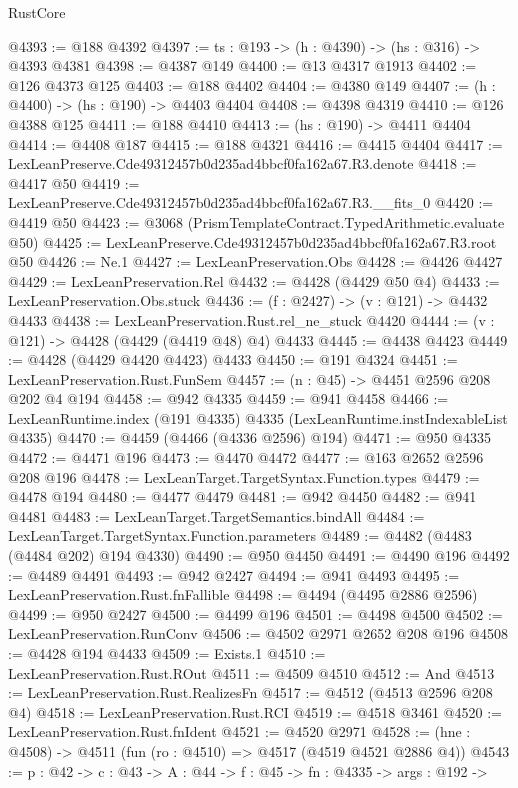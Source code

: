\begin{lexlean}{RustCore}
\begin{coremodule}
@4393 := @188 @4392
@4397 := {ts : @193} -> (h : @4390) -> (hs : @316) -> @4393 @4381
@4398 := @4387 @149
@4400 := @13 @4317 @1913
@4402 := @126 @4373 @125
@4403 := @188 @4402
@4404 := @4380 @149
@4407 := (h : @4400) -> (hs : @190) -> @4403 @4404
@4408 := @4398 @4319
@4410 := @126 @4388 @125
@4411 := @188 @4410
@4413 := (hs : @190) -> @4411 @4404
@4414 := @4408 @187
@4415 := @188 @4321
@4416 := @4415 @4404
@4417 := LexLeanPreserve.Cde49312457b0d235ad4bbcf0fa162a67.R3.denote
@4418 := @4417 @50
@4419 := LexLeanPreserve.Cde49312457b0d235ad4bbcf0fa162a67.R3.__fits_0
@4420 := @4419 @50
@4423 := @3068 (PrismTemplateContract.TypedArithmetic.evaluate @50)
@4425 := LexLeanPreserve.Cde49312457b0d235ad4bbcf0fa162a67.R3.root @50
@4426 := Ne.{1}
@4427 := LexLeanPreservation.Obs
@4428 := @4426 @4427
@4429 := LexLeanPreservation.Rel
@4432 := @4428 (@4429 @50 @4)
@4433 := LexLeanPreservation.Obs.stuck
@4436 := (f : @2427) -> (v : @121) -> @4432 @4433
@4438 := LexLeanPreservation.Rust.rel_ne_stuck @4420
@4444 := (v : @121) -> @4428 (@4429 (@4419 @48) @4) @4433
@4445 := @4438 @4423
@4449 := @4428 (@4429 @4420 @4423) @4433
@4450 := @191 @4324
@4451 := LexLeanPreservation.Rust.FunSem
@4457 := (n : @45) -> @4451 @2596 @208 @202 @4 @194
@4458 := @942 @4335
@4459 := @941 @4458
@4466 := LexLeanRuntime.index (@191 @4335) @4335 (LexLeanRuntime.instIndexableList @4335)
@4470 := @4459 (@4466 (@4336 @2596) @194)
@4471 := @950 @4335
@4472 := @4471 @196
@4473 := @4470 @4472
@4477 := @163 @2652 @2596 @208 @196
@4478 := LexLeanTarget.TargetSyntax.Function.types
@4479 := @4478 @194
@4480 := @4477 @4479
@4481 := @942 @4450
@4482 := @941 @4481
@4483 := LexLeanTarget.TargetSemantics.bindAll
@4484 := LexLeanTarget.TargetSyntax.Function.parameters
@4489 := @4482 (@4483 (@4484 @202) @194 @4330)
@4490 := @950 @4450
@4491 := @4490 @196
@4492 := @4489 @4491
@4493 := @942 @2427
@4494 := @941 @4493
@4495 := LexLeanPreservation.Rust.fnFallible
@4498 := @4494 (@4495 @2886 @2596)
@4499 := @950 @2427
@4500 := @4499 @196
@4501 := @4498 @4500
@4502 := LexLeanPreservation.RunConv
@4506 := @4502 @2971 @2652 @208 @196
@4508 := @4428 @194 @4433
@4509 := Exists.{1}
@4510 := LexLeanPreservation.Rust.ROut
@4511 := @4509 @4510
@4512 := And
@4513 := LexLeanPreservation.Rust.RealizesFn
@4517 := @4512 (@4513 @2596 @208 @4)
@4518 := LexLeanPreservation.Rust.RCI
@4519 := @4518 @3461
@4520 := LexLeanPreservation.Rust.fnIdent
@4521 := @4520 @2971
@4528 := (hne : @4508) -> @4511 (fun (ro : @4510) => @4517 (@4519 @4521 @2886 @4))
@4543 := {p : @42} ->
  {c : @43} ->
  {A : @44} ->
  {f : @45} ->
  {fn : @4335} ->
  {args : @192} ->

\end{coremodule}
\end{lexlean}
